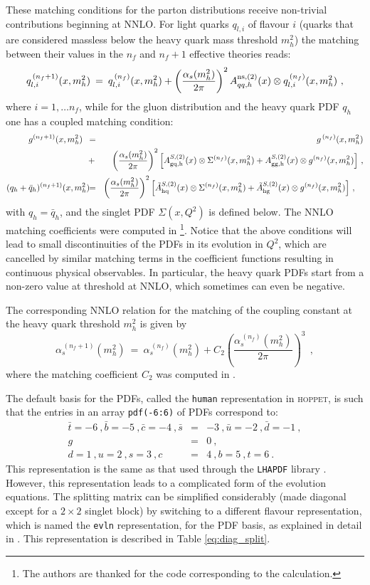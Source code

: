 \documentclass[12pt]{article}
\newcommand{\be}{\begin{equation}}
\newcommand{\ee}{\end{equation}}
\newcommand{\bea}{\begin{eqnarray}}
\newcommand{\eea}{\end{eqnarray}}
\newcommand{\lp}{\left(}
\newcommand{\rp}{\right)}
\newcommand{\nf}{n_f)}
\newcommand{\nn}{\nonumber}
\newcommand{\as}{\alpha_s}
\newcommand{\hoppet}{\textsc{hoppet}\xspace}
\newcommand{\ttt}[1]{\texttt{#1}}
\begin{document}
These matching conditions for the parton distributions
receive non-trivial contributions beginning at NNLO.
For light quarks $q_{l,i}$ of flavour $i$ 
(quarks that are considered massless
below the heavy quark mass threshold $m_h^2$) the matching between
their values in the $n_f$ and
$n_f+1$ effective theories reads:
\be
\label{eq:lp-nf1}
  q_{l,i}^{\,(n_f+1)}(x,m_h^2) \: = \:  q_{l,i}^{\,(\nf}(x,m_h^2) +
\lp \frac{\alpha_s(m_h^2)}{2\pi} \rp^2
   A^{\rm ns,(2)}_{qq,h}(x) \otimes
  q_{l,i}^{\, (\nf}(x,m_h^2) \ ,
\ee
where  $i = 1,\ldots n_f$, while for the gluon
distribution and the heavy quark PDF $q_h$ one has a coupled matching 
condition:
\bea
\label{eq:hp-nf1}
  g^{(n_f+1)}(x,m_h^2) \:\:\: &\! = \!\! &
    g^{\, (\nf}(x,m_h^2) 
\\ &+& \lp \frac{\alpha_s(m_h^2)}{2\pi} \rp^2 \Big[
    A_{\rm gq,h}^{S,(2)}(x) \otimes \Sigma^{(\nf}(x,m_h^2) +
    A_{\rm gg,h}^{S,(2)}(x) \otimes g^{(\nf}(x,m_h^2) \Big ]\ ,
  \nn \\[0.5mm] 
  (q_h+\bar{q}_{h})^{(n_f+1)}(x,m_h^2) \! &\! =\!\! &
   \lp \frac{\alpha_s(m_h^2)}{2\pi} \rp^2 \Big [
    \tilde{A}_{\rm hq}^{S,(2)}(x)\otimes \Sigma^{(\nf}(x,m_h^2) 
    + \tilde{A}_{\rm hg}^{S,(2)}(x)\otimes g^{(\nf}(x,m_h^2) \Big  ] \ ,
  \quad \nonumber
\eea
with $q_h=\bar{q}_h$, and the singlet PDF $\Sigma(x,Q^2)$ is defined
below. 
The NNLO matching coefficients were
computed in \cite{NNLO-MTM}\footnote{The authors are thanked 
for the code corresponding to the
calculation.}.
Notice that the above conditions will lead to small discontinuities
of the PDFs in its evolution in $Q^2$, 
which are cancelled by similar matching terms
in the coefficient functions resulting in continuous physical
observables. In particular, the heavy quark PDFs start from a non-zero
value at threshold at NNLO, which sometimes can even be
negative.

The corresponding NNLO relation for the matching of the coupling constant 
at the heavy quark threshold $m^2_h$ is given by
\be
\label{eq:as-nf1}
  \as^{\, (n_f+1)}(m_h^2) \: = \:
  \as^{\, (\nf} (m_h^2) +   C_2 \lp \frac{\as^{\, (\nf} (m_h^2)}{2\pi} \rp^3
   \:\: ,
\ee
where the matching coefficient $C_2$ was computed in \cite{Chetyrkin:1997sg}.


The default basis for the PDFs, called the \ttt{human} 
representation in \hoppet, is such that 
 the entries in an array
\ttt{pdf(-6:6)} of PDFs correspond to:
\bea 
\bar t={-6} \ ,  \bar b={-5} \ ,  \bar c={-4}
\ , \nn   \bar s&=&{-3} \ , \nn  \bar u={-2} \ , \nn
 \bar d={-1} \ , \\  g&=&{0} \ , \\ \nn   d={1} \ , \nn  u={2} 
\ , \nn  
s={3} \ , \nn   c&=&{4} \ , \nn b={5} \ , \nn  t={6} \ . \nn 
\eea
 This representation is the
same as that used through the \ttt{LHAPDF} library \cite{LHAPDF}. 
However, this representation leads
to a complicated form of the evolution equations.
The splitting matrix can be simplified considerably (made diagonal
except for a $2\times2$ singlet block) by switching to a different
flavour representation, which is named
the \ttt{evln} representation, for the PDF basis, as explained in detail in
\cite{vanNeerven:1999ca,vanNeerven:2000uj}. This representation
is described in Table \ref{eq:diag_split}.
\end{document}

